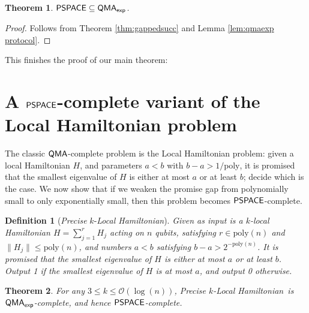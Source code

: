 \documentclass[11pt]{article}
\newtheorem{theorem}{Theorem}
\newtheorem{definition}{Definition}
\theoremstyle{definition}
\theoremstyle{remark}
\newcommand\QMA{{\sf{QMA}}}
\newcommand\PSPACE{{\sf{PSPACE}}}
\newcommand\QMAexp{{\sf{QMA}_{exp}}}
\newcommand\preciseklh{\textit{Precise }$k$-\textit{Local Hamiltonian}}
\newcommand{\poly}{\mathrm{poly}}
\begin{document}
\begin{theorem}
$\PSPACE\subseteq\QMAexp$.
\end{theorem}
\begin{proof}
Follows from Theorem \ref{thm:gappedsucc} and Lemma \ref{lem:qmaexp protocol}.
\end{proof}
This finishes the proof of our main theorem:
\thmmain*

\section{A $\PSPACE$-complete variant of the Local Hamiltonian problem}
The classic $\QMA$-complete problem is the Local Hamiltonian problem: given a local Hamiltonian $H$, and parameters $a < b$ with $b-a > 1/\poly$, it is promised that the smallest eigenvalue of $H$ is either at most $a$ or at least $b$; decide which is the case. We now show that if we weaken the promise gap from polynomially small to only exponentially small, then this problem becomes $\PSPACE$-complete.
\begin{definition}[\preciseklh]
Given as input is a $k$-local Hamiltonian $H=\sum_{j=1}^rH_j$ acting on $n$ qubits, satisfying $r \in \poly(n)$ and $\|H_j\| \le \poly(n)$, and numbers $a < b$ satisfying $b - a > 2^{-\poly(n)}$. It is promised that the smallest eigenvalue of $H$ is either at most $a$ or at least $b$. Output 1 if the smallest eigenvalue of $H$ is at most $a$, and output 0 otherwise.
\end{definition}

\begingroup
\def\thetheorem{\ref{thm:lh}}
\begin{theorem}
For any $3 \le k \le \mathcal{O}(\log(n))$, \preciseklh \ is $\QMAexp$-complete, and hence $\PSPACE$-complete.
\end{theorem}
\addtocounter{theorem}{-1}
\endgroup
\end{document}
